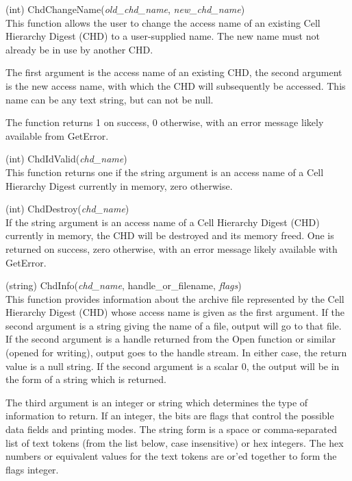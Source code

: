 \begin{description}
\item{(int) \vt ChdChangeName({\it old\_chd\_name\/},
  {\it new\_chd\_name\/})}\\
This function allows the user to change the access name of an existing
Cell Hierarchy Digest (CHD) to a user-supplied name.  The new name
must not already be in use by another CHD.

The first argument is the access name of an existing CHD, the second
argument is the new access name, with which the CHD will subsequently
be accessed.  This name can be any text string, but can not be null.

The function returns 1 on success, 0 otherwise, with an error message
likely available from {\vt GetError}.

\item{(int) \vt ChdIdValid({\it chd\_name\/})}\\
This function returns one if the string argument is an access name of
a Cell Hierarchy Digest currently in memory, zero otherwise.

\item{(int) \vt ChdDestroy({\it chd\_name\/})}\\
If the string argument is an access name of a Cell Hierarchy Digest
(CHD) currently in memory, the CHD will be destroyed and its memory
freed.  One is returned on success, zero otherwise, with an error
message likely available with {\vt GetError}.

\label{ChdInfo}
\item{(string) \vt ChdInfo({\it chd\_name\/}, {\vt handle\_or\_filename\/},
 {\it flags\/})}\\
This function provides information about the archive file represented
by the Cell Hierarchy Digest (CHD) whose access name is given as the
first argument.  If the second argument is a string giving the name of
a file, output will go to that file.  If the second argument is a
handle returned from the {\vt Open} function or similar (opened for
writing), output goes to the handle stream.  In either case, the
return value is a null string.  If the second argument is a scalar 0,
the output will be in the form of a string which is returned.

The third argument is an integer or string which determines the type
of information to return.  If an integer, the bits are flags that
control the possible data fields and printing modes.  The string form
is a space or comma-separated list of text tokens (from the list
below, case insensitive) or hex integers.  The hex numbers or
equivalent values for the text tokens are or'ed together to form the
flags integer.
  

\end{description}
